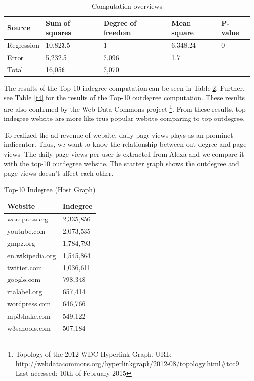 \begin{table}[H]
	\caption{Computation overviews}
	\label{t5}
	\begin{center}
		\begin{tabular}{|l|l|l|l|l|}
			\hline		
			Source	&Sum of squares	&Degree of freedom	&Mean square &P-value\\ \hline
			Regression	& 10,823.5	& 1	& 6,348.24	& 0 \\ \hline
			Error	& 5,232.5	& 3,096	& 1.7	& \\ \hline
			Total	& 16,056	& 3,070	&	& \\ \hline
		\end{tabular}
	\end{center}
\end{table}

The results of the Top-10 indegree computation can be seen in Table \ref{t4a}. Further, see Table \ref{t4} for the results of the Top-10 outdegree computation. These results are also confirmed by the Web Data Commons project \footnote{Topology of the 2012 WDC Hyperlink Graph. URL: http://webdatacommons.org/hyperlinkgraph/2012-08/topology.html\#toc9 Last accessed: 10th of February 2015}. From these results, top indegree website are more like true popular website comparing to top outdegree. 

To realized the ad revenue of website, daily page views plays as an prominet indicantor. Thus, we want to know the relationship between out-degree and page views. The daily page views per user is extracted from Alexa and we compare it with the top-10 outdegree website. The scatter graph shows the outdegree and page views doesn't affect each other.

\begin{table}[H]
	\caption{Top-10 Indegree (Host Graph)}
	\label{t4a}
	\begin{center}
		\begin{tabular}{|l|l|}
			\hline
			Website	&Indegree \\ \hline
			wordpress.org	&2,335,856 \\ \hline
			youtube.com	&2,073,535 \\ \hline
			gmpg.org	&1,784,793 \\ \hline
			en.wikipedia.org	&1,545,864 \\ \hline
			twitter.com	&1,036,611 \\ \hline
			google.com	&798,348 \\ \hline
			rtalabel.org	&657,414 \\ \hline
			wordpress.com	&646,766 \\ \hline
			mp3shake.com	&549,122 \\ \hline
			w3schools.com	&507,184 \\ \hline
		\end{tabular}
	\end{center}
\end{table}

